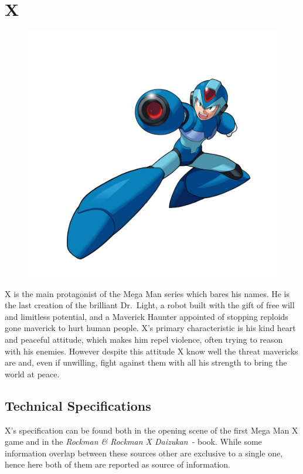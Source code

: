 \chapter{X}\label{char:X}
\begin{figure}[h]
	\centering
	\includegraphics[width=0.6\linewidth]{figures/Characters/Char_MMX.png}
\end{figure}

X is the main protagonist of the Mega Man series which bares his names. He is the last creation of the brilliant Dr.~Light, a robot built with the gift of free will and limitless potential, and a Maverick Haunter appointed of stopping reploids gone maverick to hurt human people. 
X's primary characteristic is his kind heart and peaceful attitude, which makes him repel violence, often trying to reason with his enemies. However despite this attitude X know well the threat mavericks are and, even if unwilling, fight against them with all his strength to bring the world at peace.

\section{Technical Specifications}
X's specification can be found both in the opening scene of the first Mega Man X game and in the \emph{Rockman \& Rockman X Daizukan}~\cite{book:RRXD}-\cite{X_specs_translated} book. While some information overlap between these sources other are exclusive to a single one, hence here both of them are reported as source of information.

